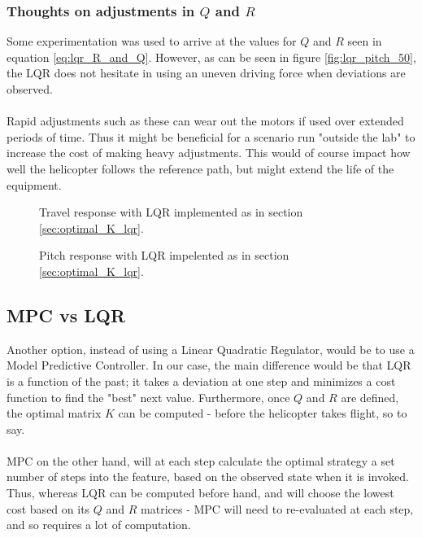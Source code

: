 \subsubsection{Thoughts on adjustments in $Q$ and $R$}
Some experimentation was used to arrive at the values for $Q$ and $R$ seen in equation \ref{eq:lqr_R_and_Q}. However, as can be seen in figure \ref{fig:lqr_pitch_50}, the LQR does not hesitate in using an uneven driving force when deviations are observed.\\
\\
Rapid adjustments such as these can wear out the motors if used over extended periods of time. Thus it might be beneficial for a scenario run "outside the lab" to increase the cost of making heavy adjustments. This would of course impact how well the helicopter follows the reference path, but might extend the life of the equipment.
\begin{figure}
        \centering
        \setlength{\figureheight}{6cm}
        \setlength{\figurewidth}{10cm}
        
        \caption{Travel response with LQR implemented as in section \ref{sec:optimal_K_lqr}.}
        \label{fig:lqr_travel_50}
\label{fig:ex3_travel} 
\end{figure}    
\begin{figure}
        \centering
        \setlength{\figureheight}{6cm}
        \setlength{\figurewidth}{10cm}
        
        \caption{Pitch response with LQR impelented as in section \ref{sec:optimal_K_lqr}.}
        \label{fig:lqr_pitch_50}
\label{fig:ex3_u} 
\end{figure} 
\subsection{MPC vs LQR}
Another option, instead of using a Linear Quadratic Regulator, would be to use a Model Predictive Controller. In our case, the main difference would be that LQR is a function of the past; it takes a deviation at one step and minimizes a cost function to find the "best" next value. Furthermore, once $Q$ and $R$ are defined, the optimal matrix $K$ can be computed - before the helicopter takes flight, so to say.\\
\\
MPC on the other hand, will at each step calculate the optimal strategy a set number of steps into the feature, based on the observed state when it is invoked. Thus, whereas LQR can be computed before hand, and will choose the lowest cost based on its $Q$ and $R$ matrices - MPC will need to re-evaluated at each step, and so requires a lot of computation.








